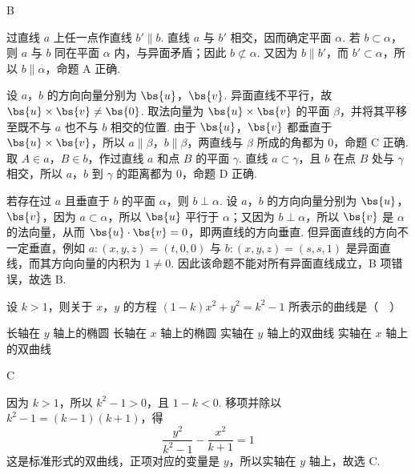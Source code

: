 \begin{answer}
B
\end{answer}

\begin{solution}
过直线 \(a\) 上任一点作直线 \(b'\parallel b\). 直线 \(a\) 与 \(b'\) 相交，因而确定平面 \(\alpha\). 若 \(b\subset\alpha\)，则 \(a\) 与 \(b\) 同在平面 \(\alpha\) 内，与异面矛盾；因此 \(b\not\subset\alpha\). 又因为 \(b\parallel b'\)，而 \(b'\subset\alpha\)，所以 \(b\parallel\alpha\)，命题 A 正确.

设 \(a\)，\(b\) 的方向向量分别为 \(\bs{u}\)，\(\bs{v}\). 异面直线不平行，故 \(\bs{u}\times\bs{v}\neq\bs{0}\). 取法向量为 \(\bs{u}\times\bs{v}\) 的平面 \(\beta\)，并将其平移至既不与 \(a\) 也不与 \(b\) 相交的位置. 由于 \(\bs{u}\)，\(\bs{v}\) 都垂直于 \(\bs{u}\times\bs{v}\)，所以 \(a\parallel\beta\)，\(b\parallel\beta\)，两直线与 \(\beta\) 所成的角都为 \(0\)，命题 C 正确. 取 \(A\in a\)，\(B\in b\)，作过直线 \(a\) 和点 \(B\) 的平面 \(\gamma\). 直线 \(a\subset\gamma\)，且 \(b\) 在点 \(B\) 处与 \(\gamma\) 相交，所以 \(a\)，\(b\) 到 \(\gamma\) 的距离都为 \(0\)，命题 D 正确.

若存在过 \(a\) 且垂直于 \(b\) 的平面 \(\alpha\)，则 \(b\perp\alpha\). 设 \(a\)，\(b\) 的方向向量分别为 \(\bs{u}\)，\(\bs{v}\)，因为 \(a\subset\alpha\)，所以 \(\bs{u}\) 平行于 \(\alpha\)；又因为 \(b\perp\alpha\)，所以 \(\bs{v}\) 是 \(\alpha\) 的法向量，从而 \(\bs{u}\cdot\bs{v}=0\)，即两直线的方向垂直. 但异面直线的方向不一定垂直，例如 \(a:(x,y,z)=(t,0,0)\) 与 \(b:(x,y,z)=(s,s,1)\) 是异面直线，而其方向向量的内积为 \(1\neq0\). 因此该命题不能对所有异面直线成立，B 项错误，故选 B.
\end{solution}

\begin{problem}
设 \(k > 1\)，则关于 \(x\)，\(y\) 的方程 \((1 - k)x^{2} + y^{2} = k^{2} - 1\) 所表示的曲线是（\(\quad\)）

\choices
    {长轴在 \(y\) 轴上的椭圆}
    {长轴在 \(x\) 轴上的椭圆}
    {实轴在 \(y\) 轴上的双曲线}
    {实轴在 \(x\) 轴上的双曲线}
\end{problem}

\begin{answer}
C
\end{answer}

\begin{solution}
因为 \(k>1\)，所以 \(k^2-1>0\)，且 \(1-k<0\). 移项并除以 \(k^2-1=(k-1)(k+1)\)，得
\[
\frac{y^2}{k^2-1}-\frac{x^2}{k+1}=1
\]
这是标准形式的双曲线，正项对应的变量是 \(y\)，所以实轴在 \(y\) 轴上，故选 C.
\end{solution}


